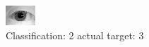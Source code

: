 \begin{figure}[h!]
\begin{center}
\includegraphics[width=0.60\columnwidth]{figures/ID1144_class_2_target_3.png}
\end{center}
\caption{ Classification: 2 actual target: 3}
\label{fig:ID1144_class_2_target_3}
\end{figure}
